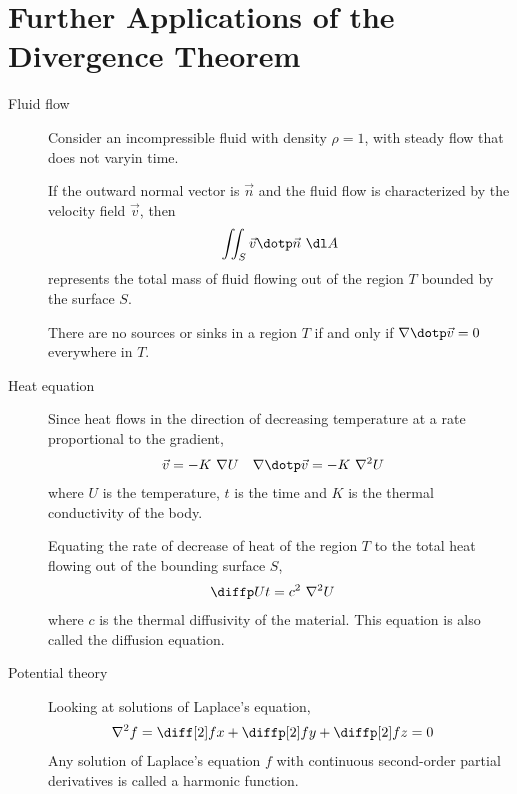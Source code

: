 \section{Further Applications of the Divergence Theorem}

\begin{description}
    \item[Fluid flow] Consider an incompressible fluid with density $ \rho = 1 $, with
        steady flow that does not varyin time. \par
        If the outward normal vector is $ \vec{n} $ and the fluid flow is characterized by
        the velocity field $ \vec{v} $, then
        \begin{align}
            \iint_S \vec{v} \dotp \vec{n}\ \dl A
        \end{align}
        represents the total mass of fluid flowing out of the region $ T $ bounded by the
        surface $ S $. \par
        There are no sources or sinks in a region $ T $ if and only if
        $ \nabla \dotp \vec{v} = 0$ everywhere in $ T $.

    \item[Heat equation] Since heat flows in the direction of decreasing temperature at a
        rate proportional to the gradient,
        \begin{align}
            \vec{v} & = -K\ \nabla U & \nabla \dotp \vec{v} & = -K\ \nabla^2 U
        \end{align}
        where $ U $ is the temperature, $ t $ is the time and $ K $ is the thermal
        conductivity of the body. \par
        Equating the rate of decrease of heat of the region $ T $ to the total heat
        flowing out of the bounding surface $ S $,
        \begin{align}
            \diffp Ut & = c^2\ \nabla^2 U
        \end{align}
        where $ c $ is the thermal diffusivity of the material. This equation is also
        called the diffusion equation.

    \item[Potential theory] Looking at solutions of Laplace's equation,
        \begin{align}
            \nabla^2 f & = \diff[2] fx + \diffp[2] fy + \diffp[2] fz = 0
        \end{align}
        Any solution of Laplace's equation $ f $ with continuous second-order partial
        derivatives is called a harmonic function.


\end{description}
